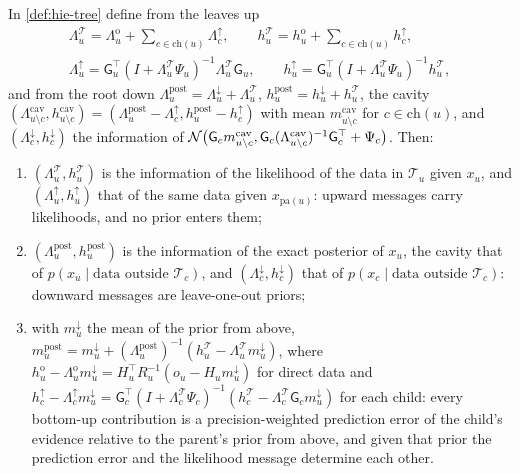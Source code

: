 \begin{theorem}\label{thm:hie-messages}
In \cref{def:hie-tree} define from the leaves up
\begin{equation}\label{eq:hie-up}
\begin{gathered}
\Lambda^{\mathcal T}_u=\Lambda^{\mathrm o}_u+\sum_{c\in\mathrm{ch}(u)}\Lambda^\uparrow_c,\qquad h^{\mathcal T}_u=h^{\mathrm o}_u+\sum_{c\in\mathrm{ch}(u)}h^\uparrow_c,\\
\Lambda^\uparrow_u=\mathsf G_u^\top(I+\Lambda^{\mathcal T}_u\Psi_u)^{-1}\Lambda^{\mathcal T}_u\mathsf G_u,\qquad h^\uparrow_u=\mathsf G_u^\top(I+\Lambda^{\mathcal T}_u\Psi_u)^{-1}h^{\mathcal T}_u,
\end{gathered}
\end{equation}
and from the root down $\Lambda^{\mathrm{post}}_u=\Lambda^\downarrow_u+\Lambda^{\mathcal T}_u$, $h^{\mathrm{post}}_u=h^\downarrow_u+h^{\mathcal T}_u$, the cavity $(\Lambda^{\mathrm{cav}}_{u\setminus c},h^{\mathrm{cav}}_{u\setminus c})=(\Lambda^{\mathrm{post}}_u-\Lambda^\uparrow_c,h^{\mathrm{post}}_u-h^\uparrow_c)$ with mean $m^{\mathrm{cav}}_{u\setminus c}$ for $c\in\mathrm{ch}(u)$, and $(\Lambda^\downarrow_c,h^\downarrow_c)$ the information of $\mathcal{N}\bigl(\mathsf G_cm^{\mathrm{cav}}_{u\setminus c},\mathsf G_c(\Lambda^{\mathrm{cav}}_{u\setminus c})^{-1}\mathsf G_c^\top+\Psi_c\bigr)$. Then:
\begin{enumerate}
\item[(a)] $(\Lambda^{\mathcal T}_u,h^{\mathcal T}_u)$ is the information of the likelihood of the data in $\mathcal T_u$ given $x_u$, and $(\Lambda^\uparrow_u,h^\uparrow_u)$ that of the same data given $x_{\mathrm{pa}(u)}$: upward messages carry likelihoods, and no prior enters them;
\item[(b)] $(\Lambda^{\mathrm{post}}_u,h^{\mathrm{post}}_u)$ is the information of the exact posterior of $x_u$, the cavity that of $p(x_u\mid\text{data outside }\mathcal T_c)$, and $(\Lambda^\downarrow_c,h^\downarrow_c)$ that of $p(x_c\mid\text{data outside }\mathcal T_c)$: downward messages are leave-one-out priors;
\item[(c)] with $m^\downarrow_u$ the mean of the prior from above, $m^{\mathrm{post}}_u=m^\downarrow_u+(\Lambda^{\mathrm{post}}_u)^{-1}(h^{\mathcal T}_u-\Lambda^{\mathcal T}_um^\downarrow_u)$, where $h^{\mathrm o}_u-\Lambda^{\mathrm o}_um^\downarrow_u=H_u^\top R_u^{-1}(o_u-H_um^\downarrow_u)$ for direct data and $h^\uparrow_c-\Lambda^\uparrow_cm^\downarrow_u=\mathsf G_c^\top(I+\Lambda^{\mathcal T}_c\Psi_c)^{-1}(h^{\mathcal T}_c-\Lambda^{\mathcal T}_c\mathsf G_cm^\downarrow_u)$ for each child: every bottom-up contribution is a precision-weighted prediction error of the child's evidence relative to the parent's prior from above, and given that prior the prediction error and the likelihood message determine each other.
\end{enumerate}
\end{theorem}

